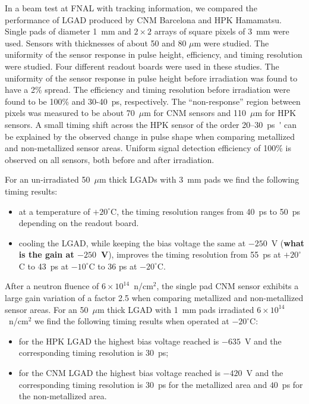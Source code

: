 \documentclass[preprint,1p]{elsarticle}
\begin{document}
In a beam test at FNAL with tracking information, we compared the performance of
LGAD produced by CNM Barcelona and HPK Hamamatsu. Single pads of diameter 1~mm
and $2\times 2$ arrays of square pixels of 3~mm were used. Sensors with
thicknesses of about 50 and 80 $\mu$m were studied. The uniformity of the
sensor response in pulse height, efficiency, and timing resolution
were studied. Four different readout boards 
were used in these studies. The uniformity of the
sensor response in pulse height before irradiation was found to have a
2\% spread. The efficiency and timing  resolution before irradiation
were found to be 100\%  and 30-40~\si{ps}, respectively. The
``non-response'' region between pixels was measured to be about 70~$\mu$m for CNM sensors and 110~$\mu$m for HPK sensors. 
A small timing shift across the HPK sensor of the order 20--30~\si{ps'} can
be explained by the observed change in pulse shape when comparing metallized and
non-metallized sensor areas. Uniform signal detection efficiency of 100\% is
observed on all sensors, both before and after irradiation. 

For an un-irradiated 50~$\mu$m thick LGADs with 3~mm pads we find the following timing results: 
\begin{itemize}
  \item at a temperature of $+20^{\circ}$C, the timing resolution ranges from
        40~ps to 50~ps depending on the readout board. %
  \item cooling the LGAD, while keeping the bias voltage the same at $-250$~V
        (\textbf {what is the gain at $-250$~V}),
        improves the timing resolution from 55~ps at $+20^{\circ}$C to 43~ps at
        $-10^{\circ}$C to 36 ps at $-20^{\circ}$C. \end{itemize}

After a neutron fluence of $6\times 10^{14}$~n/cm$^2$, the single pad CNM sensor
exhibits a large gain variation of a factor 2.5 when comparing metallized and
non-metallized sensor areas. For an 50~$\mu$m thick LGAD with 1~mm pads
irradiated $6\times 10^{14}$~n/cm$^2$ we find the following timing results when
operated at $-20^{\circ}$C: 

\begin{itemize}
  \item for the HPK LGAD the highest bias voltage reached is $-635$~V
    and the corresponding timing resolution is 30~ps; 
  \item for the CNM LGAD the highest bias voltage reached is $-420$~V
    and the corresponding
        timing resolution is 30~ps for the metallized area and $40$~ps for the
        non-metallized area.
\end{itemize}
\end{document}
